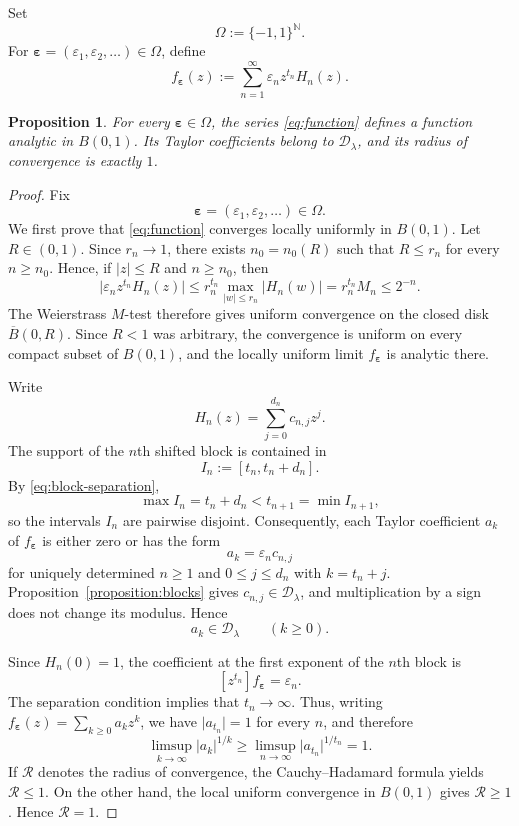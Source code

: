 \documentclass[10pt]{amsart}
\newtheorem{proposition}[theorem]{Proposition}
\theoremstyle{definition}
\theoremstyle{remark}
\numberwithin{equation}{section}
\newcommand{\N}{\mathbb N}
\newcommand{\D}{\mathcal D}
\newcommand{\abs}[1]{\lvert #1\rvert}
\newcommand{\B}{B(0,1)}
\begin{document}
Set
\[
        \Omega:=\{-1,1\}^{\N}.
\]
For $\boldsymbol\varepsilon=(\varepsilon_1,\varepsilon_2,\ldots)\in\Omega$,
define
\begin{equation}\label{eq:function}
        f_{\boldsymbol\varepsilon}(z)
        :=\sum_{n=1}^{\infty}
        \varepsilon_nz^{t_n}H_n(z).
\end{equation}

\begin{proposition}\label{proposition:analytic}
For every $\boldsymbol\varepsilon\in\Omega$, the series
\eqref{eq:function} defines a function analytic in $\B$. Its Taylor
coefficients belong to $\D_\lambda$, and its radius of convergence is
exactly $1$.
\end{proposition}

\begin{proof}
Fix
\[
        \boldsymbol\varepsilon
        =(\varepsilon_1,\varepsilon_2,\ldots)\in\Omega.
\]
We first prove that \eqref{eq:function} converges locally uniformly in
$\B$. Let $R\in(0,1)$. Since $r_n\to1$, there exists $n_0=n_0(R)$ such
that $R\leq r_n$ for every $n\geq n_0$. Hence, if $\abs z\leq R$ and
$n\geq n_0$, then
\[
        \abs{\varepsilon_nz^{t_n}H_n(z)}
        \leq
        r_n^{t_n}\max_{\abs w\leq r_n}\abs{H_n(w)}
        =
        r_n^{t_n}M_n
        \leq2^{-n}.
\]
The Weierstrass $M$-test therefore gives uniform convergence on the closed
disk $\overline{B}(0,R)$. Since $R<1$ was arbitrary, the convergence is
uniform on every compact subset of $\B$, and the locally uniform limit
$f_{\boldsymbol\varepsilon}$ is analytic there.

Write
\[
        H_n(z)=\sum_{j=0}^{d_n}c_{n,j}z^j.
\]
The support of the $n$th shifted block is contained in
\[
        I_n:=[t_n,t_n+d_n].
\]
By \eqref{eq:block-separation},
\[
        \max I_n=t_n+d_n<t_{n+1}=\min I_{n+1},
\]
so the intervals $I_n$ are pairwise disjoint. Consequently, each Taylor
coefficient $a_k$ of $f_{\boldsymbol\varepsilon}$ is either zero or has the
form
\[
        a_k=\varepsilon_nc_{n,j}
\]
for uniquely determined $n\geq1$ and $0\leq j\leq d_n$ with
$k=t_n+j$. Proposition~\ref{proposition:blocks} gives
$c_{n,j}\in\D_\lambda$, and multiplication by a sign does not change its
modulus. Hence
\[
        a_k\in\D_\lambda
        \qquad(k\geq0).
\]

Since $H_n(0)=1$, the coefficient at the first exponent of the $n$th block
is
\begin{equation}\label{eq:marker}
        [z^{t_n}]f_{\boldsymbol\varepsilon}
        =
        \varepsilon_n.
\end{equation}
The separation condition implies that $t_n\to\infty$. Thus, writing
$f_{\boldsymbol\varepsilon}(z)=\sum_{k\geq0}a_kz^k$, we have
$\abs{a_{t_n}}=1$ for every $n$, and therefore
\[
        \limsup_{k\to\infty}\abs{a_k}^{1/k}
        \geq
        \limsup_{n\to\infty}\abs{a_{t_n}}^{1/t_n}
        =1.
\]
If $\mathcal R$ denotes the radius of convergence, the
Cauchy--Hadamard formula yields $\mathcal R\leq1$. On the other hand, the
local uniform convergence in $\B$ gives $\mathcal R\geq1$. Hence
$\mathcal R=1$.
\end{proof}
\end{document}
